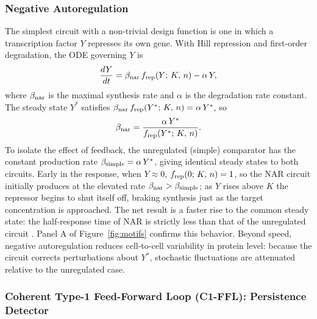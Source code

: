 \subsubsection*{Negative Autoregulation}

The simplest circuit with a non-trivial design function is one in which a
transcription factor $Y$ represses its own gene.  With Hill repression and
first-order degradation, the ODE governing $Y$ is
\begin{equation}\label{eq:nar}
  \frac{dY}{dt} = \beta_{\rm nar}\,f_{\rm rep}(Y;\,K,\,n) - \alpha\,Y,
\end{equation}
where $\beta_{\rm nar}$ is the maximal synthesis rate and $\alpha$ is the
degradation rate constant.  The steady state $Y^*$ satisfies
$\beta_{\rm nar}\,f_{\rm rep}(Y^*;\,K,\,n) = \alpha\,Y^*$, so
\begin{equation}\label{eq:beta_nar}
  \beta_{\rm nar} = \frac{\alpha\,Y^*}{f_{\rm rep}(Y^*;\,K,\,n)}.
\end{equation}
To isolate the effect of feedback, the unregulated (simple) comparator has
the constant production rate $\beta_{\rm simple} = \alpha\,Y^*$, giving
identical steady states to both circuits.  Early in the response, when
$Y \approx 0$, $f_{\rm rep}(0;\,K,\,n) = 1$, so the NAR circuit initially
produces at the elevated rate $\beta_{\rm nar} > \beta_{\rm simple}$; as $Y$
rises above $K$ the repressor begins to shut itself off, braking synthesis
just as the target concentration is approached.  The net result is a faster
rise to the common steady state: the half-response time of NAR is strictly less
than that of the unregulated circuit \cite{Alon2006}.  Panel A of
Figure~\ref{fig:motifs} confirms this behavior.  Beyond speed, negative
autoregulation reduces cell-to-cell variability in protein level: because the
circuit corrects perturbations about $Y^*$, stochastic fluctuations are
attenuated relative to the unregulated case.

\subsubsection*{Coherent Type-1 Feed-Forward Loop (C1-FFL): Persistence Detector}

